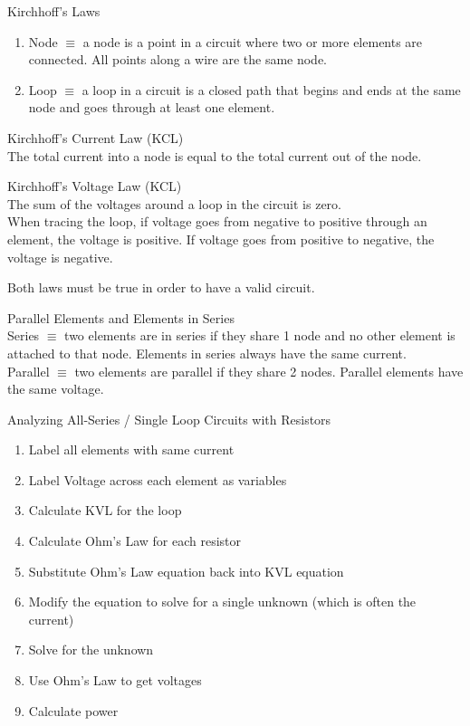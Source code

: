 \documentclass{article}
\begin{document}
\noindent
\Large
Kirchhoff's Laws\\
\normalsize
\noindent
\begin{enumerate}
  \item {
  Node $\equiv$ a node is a point in a circuit where two or more elements are connected. All points along a wire are the same node.
  }
  \item {
  Loop $\equiv$ a loop in a circuit is a closed path that begins and ends at the same node and goes through at least one element.
  }
\end{enumerate}

\noindent
Kirchhoff's Current Law (KCL)\\
\indent
The total current into a node is equal to the total current out of the node.

\noindent
Kirchhoff's Voltage Law (KCL)\\
\indent
The sum of the voltages around a loop in the circuit is zero.\\
When tracing the loop, if voltage goes from negative to positive through an element, the voltage is positive. If voltage goes from positive to negative, the voltage is negative.

\noindent
Both laws must be true in order to have a valid circuit.

\noindent
\Large
Parallel Elements and Elements in Series\\
\normalsize
\noindent
Series $\equiv$ two elements are in series if they share 1 node and no other element is attached to that node. Elements in series always have the same current.\\
Parallel $\equiv$ two elements are parallel if they share 2 nodes. Parallel elements have the same voltage.

\noindent
\Large
Analyzing All-Series / Single Loop Circuits with Resistors\\
\normalsize
\begin{enumerate}
  \item Label all elements with same current
  \item Label Voltage across each element as variables
  \item Calculate KVL for the loop
  \item Calculate Ohm's Law for each resistor
  \item Substitute Ohm's Law equation back into KVL equation
  \item Modify the equation to solve for a single unknown (which is often the current)
  \item Solve for the unknown
  \item Use Ohm's Law to get voltages
  \item Calculate power
\end{enumerate}
\end{document}
